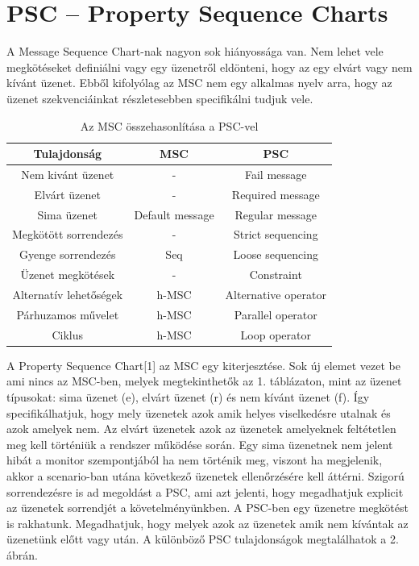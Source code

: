 \chapter{PSC – Property Sequence Charts}
A Message Sequence Chart-nak nagyon sok hiányossága van. Nem lehet vele megkötéseket definiálni vagy egy üzenetről eldönteni, hogy az egy elvárt vagy nem kívánt üzenet. Ebből kifolyólag az MSC nem egy alkalmas nyelv arra, hogy az üzenet szekvenciáinkat részletesebben specifikálni tudjuk vele.

\begin{table}[ht]
    \centering %
    \begin{tabular}{ |c|c|c| } %
    \hline
    \textbf{Tulajdonság} & \textbf{MSC} & \textbf{PSC} \\ [0.5ex] %
    \hline %
    \hline
    Nem kivánt üzenet & - & Fail message \\ %
    \hline
    Elvárt üzenet & - & Required message \\
    \hline
    Sima üzenet & Default message & Regular message \\
    \hline
    Megkötött sorrendezés & - & Strict sequencing \\
    \hline
    Gyenge sorrendezés & Seq & Loose sequencing \\
    \hline
    Üzenet megkötések & - & Constraint \\
    \hline
    Alternatív lehetőségek & h-MSC & Alternative operator \\
    \hline
    Párhuzamos művelet & h-MSC & Parallel operator \\
    \hline
    Ciklus & h-MSC & Loop operator \\
    \hline %
    \end{tabular}
    \label{table:nonlin} %
    \caption{Az MSC összehasonlítása a PSC-vel} %
\end{table}

A Property Sequence Chart[1] az MSC egy kiterjesztése. Sok új elemet vezet be ami nincs az MSC-ben, melyek megtekinthetők az 1. táblázaton, mint az üzenet típusokat: sima üzenet (e), elvárt üzenet (r) és nem kívánt üzenet (f). Így specifikálhatjuk, hogy mely üzenetek azok amik helyes viselkedésre utalnak és azok amelyek nem. Az elvárt üzenetek azok az üzenetek amelyeknek feltétetlen meg kell történiük a rendszer működése során. Egy sima üzenetnek nem jelent hibát a monitor szempontjából ha nem történik meg, viszont ha megjelenik, akkor a scenario-ban utána következő üzenetek ellenőrzésére kell áttérni. Szigorú sorrendezésre is ad megoldást a PSC, ami azt jelenti, hogy megadhatjuk explicit az üzenetek sorrendjét a követelményünkben. A PSC-ben egy üzenetre megkötést is rakhatunk. Megadhatjuk, hogy melyek azok az üzenetek amik nem kívántak az üzenetünk előtt vagy után. A különböző PSC tulajdonságok megtalálhatok a 2. ábrán.

